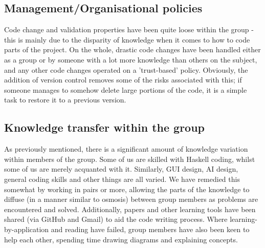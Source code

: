 \documentclass[12pt]{article}
\begin{document}
\subsection{Management/Organisational policies}
Code change and validation properties have been quite loose within the group - this is mainly due to the disparity of knowledge when it comes to how to code parts of the project. On the whole, drastic code changes have been handled either as a group or by someone with a lot more knowledge than others on the subject, and any other code changes operated on a 'trust-based' policy. Obviously, the addition of version control removes some of the risks associated with this; if someone manages to somehow delete large portions of the code, it is a simple task to restore it to a previous version.

\subsection{Knowledge transfer within the group}
As previously mentioned, there is a significant amount of knowledge variation within members of the group. Some of us are skilled with Haskell coding, whilst some of us are merely acquanted with it. Similarly, GUI design, AI design, general coding skills and other things are all varied. We have remedied this somewhat by working in pairs or more, allowing the parts of the knowledge to diffuse (in a manner similar to osmosis) between group members as problems are encountered and solved. Additionally, papers and other learning tools have been shared (via GitHub and Gmail) to aid the code writing process. Where learning-by-application and reading have failed, group members have also been keen to help each other, spending time drawing diagrams and explaining concepts.
\end{document}

